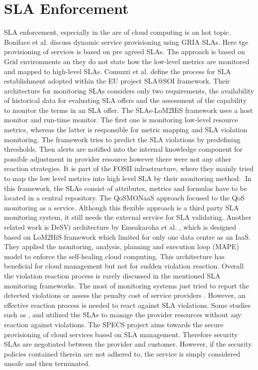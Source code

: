 \section{SLA Enforcement}
SLA enforcement, especially in the are of cloud computing is an hot topic. Boniface et al. \cite{boniface2007dynamic} discuss dynamic service provisioning using GRIA SLAs. Here tge provisioning of services is based on pre agreed SLAs. The approach is based on Grid environments an they do not state how the low-level metrics are monitored and mapped to high-level SLAs. Comuzzi et al. \cite{5175897} define the process for SLA establishment adopted within the EU project SLA@SOI framework. Their architecture for monitoring SLAs considers only two requirements, the availability of historical data for evaluating SLA offers and the assessment of the capability to monitor the terms in an SLA offer. The SLAs-LoM2HiS framework \cite{emeakaroha2010low}uses a host monitor and run-time monitor. The first one is monitoring low-level resource metrics, whereas the latter is responsible for metric mapping and SLA violation monitoring. The framework tries to predict the SLA violations by predefining thresholds. Then alerts are notified into the internal knowledge component for possible adjustment in provider resource however there were not any other reaction strategies. It is part of the FOSII \cite{fosii} infrastructure, where they mainly tried to map the low level metrics into high level SLA by their monitoring method. \cite{articleEmeakaroha2013}.In this framework, the SLAs consist of attributes, metrics and formulas have to be located in a central repository. The QoSMONaaS approach \cite{articleQoSMONaas} focused to the QoS monitoring as a service. Although this flexible approach is a third party SLA monitoring system, it still needs the external service for SLA validating. Another related work is DeSVi architecture by Emeakaroha et al. \cite{EMEAKAROHA20121017}, which is designed based on LoM2HiS \cite{5547150} framework which limited for only one data centre as an IaaS. They applied the monitoring, analysis, planning and execution loop (MAPE) model to enforce the self-healing cloud computing. This architecture has beneficial for cloud management but not for sudden violation reaction. Overall the violation reaction process is rarely discussed in the mentioned SLA monitoring frameworks. The most of monitoring systems just tried to report the detected violations \cite{6225938} \cite{5175897} or assess the penalty cost of service providers \cite{10.1007/978-3-642-22709-7_46} \cite{Dastjerdi:2012:DOA:2275356.2275360}. However, an effective reaction process is needed to react against SLA violations. Some studies such as \cite{6212007}, \cite{6150077} and \cite{WANG20121135} utilized the SLAs to manage the provider resources without any reaction against violations. The SPECS project\cite{7430360} aims towards the secure provisioning of cloud services based on SLA management. Therefore security SLAs are negotiated between the provider and customer. However, if the security policies contained therein are not adhered to, the service is simply considered unsafe and then terminated.


